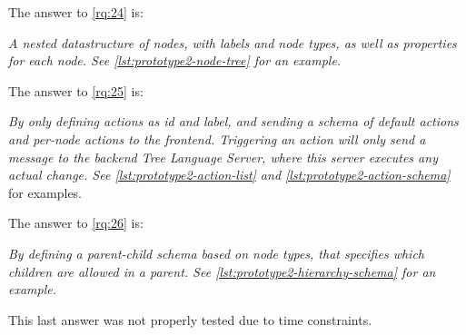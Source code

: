 The answer to \cref{rq:24} is:
\begin{displayquote}
  \emph{A nested datastructure of nodes, with labels and node types, as well as properties for each node. See \cref{lst:prototype2-node-tree} for an example.}
\end{displayquote}

The answer to \cref{rq:25} is:
\begin{displayquote}
  \emph{By only defining actions as id and label, and sending a schema of default actions and per-node actions to the frontend. Triggering an action will only send a message to the backend Tree Language Server, where this server executes any actual change. See \cref{lst:prototype2-action-list} and \cref{lst:prototype2-action-schema}} for examples.
\end{displayquote}

The answer to \cref{rq:26} is:
\begin{displayquote}
  \emph{By defining a parent-child schema based on node types, that specifies which children are allowed in a parent. See \cref{lst:prototype2-hierarchy-schema} for an example.}
\end{displayquote}
This last answer was not properly tested due to time constraints.